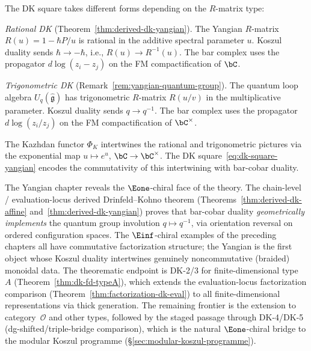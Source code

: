 \begin{remark}
\label{rem:rational-trigonometric-dk}
The DK square takes different forms depending on the $R$-matrix type:

\emph{Rational DK}
\textup{(}Theorem~\textup{\ref{thm:derived-dk-yangian})}.
The Yangian $R$-matrix $R(u) = 1 - \hbar P/u$ is rational
in the additive spectral parameter $u$.  Koszul duality sends
$\hbar \to -\hbar$, i.e., $R(u) \to R^{-1}(u)$.  The bar
complex uses the propagator $d\log(z_i - z_j)$ on the
FM compactification of $\bC$.

\emph{Trigonometric DK}
\textup{(}Remark~\textup{\ref{rem:yangian-quantum-group})}.
The quantum loop algebra $U_q(\widehat{\mathfrak{g}})$ has
trigonometric $R$-matrix $R(u/v)$ in the multiplicative
parameter.  Koszul duality sends $q \to q^{-1}$.  The bar
complex uses the propagator $d\log(z_i/z_j)$ on the
FM compactification of $\bC^\times$.

The Kazhdan functor $\Phi_K$ intertwines the rational and
trigonometric pictures via the exponential map $u \mapsto e^u$,
$\bC \to \bC^\times$.  The DK
square~\eqref{eq:dk-square-yangian} encodes the commutativity
of this intertwining with bar-cobar duality.
\end{remark}

The Yangian chapter reveals the $\Eone$-chiral face of the theory.
The chain-level / evaluation-locus derived Drinfeld--Kohno theorem
(Theorems~\ref{thm:derived-dk-affine}
and~\ref{thm:derived-dk-yangian}) proves that bar-cobar duality
\emph{geometrically implements} the quantum group involution
$q \mapsto q^{-1}$, via orientation reversal on ordered
configuration spaces.  The $\Einf$-chiral examples of the preceding
chapters all have commutative factorization structure; the Yangian is
the first object whose Koszul duality intertwines genuinely
noncommutative (braided) monoidal data.  The theorematic endpoint is
DK-2/3 for finite-dimensional type~$A$
(Theorem~\ref{thm:dk-fd-typeA}), which extends the evaluation-locus
factorization comparison (Theorem~\ref{thm:factorization-dk-eval})
to all finite-dimensional representations via thick generation.
The remaining frontier is
the extension to category~$\mathcal{O}$ and other types,
followed by the staged passage through DK-4/DK-5
(dg-shifted/triple-bridge comparison), which is the natural
$\Eone$-chiral bridge to the modular Koszul programme
(\S\ref{sec:modular-koszul-programme}).
